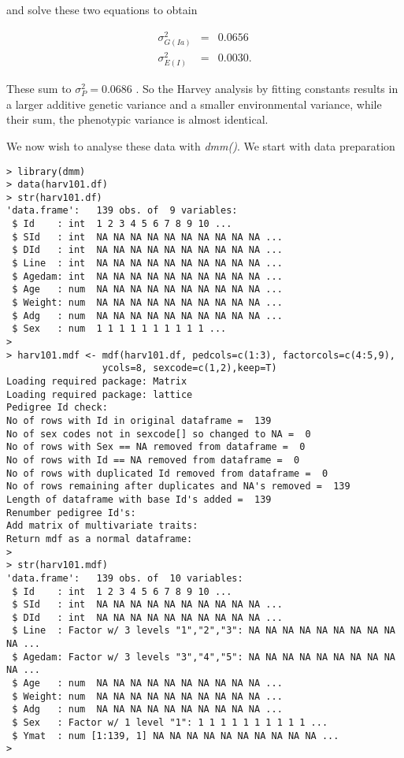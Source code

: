 \documentclass[titlepage]{article}  %
\begin{document}
and solve these two equations to obtain 

\begin{eqnarray*}
\sigma^{2}_{G(Ia)} & = & 0.0656 \\
\sigma^{2}_{E(I)} & = & 0.0030.
\end{eqnarray*}

 These sum to $\sigma^{2}_{P} = 0.0686$ . So the Harvey analysis by fitting constants results in a larger additive genetic variance and a smaller environmental variance, while their sum, the phenotypic variance is almost identical.

We now wish to analyse these data with {\em dmm()}. We start with data preparation

\begin{verbatim}
> library(dmm)
> data(harv101.df)
> str(harv101.df)
'data.frame':	139 obs. of  9 variables:
 $ Id    : int  1 2 3 4 5 6 7 8 9 10 ...
 $ SId   : int  NA NA NA NA NA NA NA NA NA NA ...
 $ DId   : int  NA NA NA NA NA NA NA NA NA NA ...
 $ Line  : int  NA NA NA NA NA NA NA NA NA NA ...
 $ Agedam: int  NA NA NA NA NA NA NA NA NA NA ...
 $ Age   : num  NA NA NA NA NA NA NA NA NA NA ...
 $ Weight: num  NA NA NA NA NA NA NA NA NA NA ...
 $ Adg   : num  NA NA NA NA NA NA NA NA NA NA ...
 $ Sex   : num  1 1 1 1 1 1 1 1 1 1 ...
> 
> harv101.mdf <- mdf(harv101.df, pedcols=c(1:3), factorcols=c(4:5,9),
                 ycols=8, sexcode=c(1,2),keep=T)
Loading required package: Matrix
Loading required package: lattice
Pedigree Id check:
No of rows with Id in original dataframe =  139 
No of sex codes not in sexcode[] so changed to NA =  0 
No of rows with Sex == NA removed from dataframe =  0 
No of rows with Id == NA removed from dataframe =  0 
No of rows with duplicated Id removed from dataframe =  0 
No of rows remaining after duplicates and NA's removed =  139 
Length of dataframe with base Id's added =  139 
Renumber pedigree Id's:
Add matrix of multivariate traits:
Return mdf as a normal dataframe:
>
> str(harv101.mdf)
'data.frame':	139 obs. of  10 variables:
 $ Id    : int  1 2 3 4 5 6 7 8 9 10 ...
 $ SId   : int  NA NA NA NA NA NA NA NA NA NA ...
 $ DId   : int  NA NA NA NA NA NA NA NA NA NA ...
 $ Line  : Factor w/ 3 levels "1","2","3": NA NA NA NA NA NA NA NA NA NA ...
 $ Agedam: Factor w/ 3 levels "3","4","5": NA NA NA NA NA NA NA NA NA NA ...
 $ Age   : num  NA NA NA NA NA NA NA NA NA NA ...
 $ Weight: num  NA NA NA NA NA NA NA NA NA NA ...
 $ Adg   : num  NA NA NA NA NA NA NA NA NA NA ...
 $ Sex   : Factor w/ 1 level "1": 1 1 1 1 1 1 1 1 1 1 ...
 $ Ymat  : num [1:139, 1] NA NA NA NA NA NA NA NA NA NA ...
> 
\end{verbatim}
\end{document}
